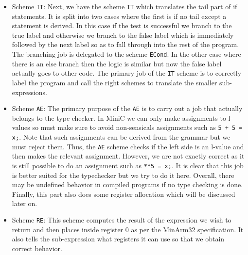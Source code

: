 \documentclass{article}
\begin{document}
\begin{itemize}
  \item Scheme \texttt{IT}: Next, we have the scheme \texttt{IT} which translates the tail part of if statements. It is split into two cases where the first is if no tail except a statement is derived. In this case if the test is successful we branch to the true label and otherwise we branch to the false label which is immediately followed by the next label so as to fall through into the rest of the program. The branching job is delegated to the scheme \texttt{ECond}. In the other case where there is an else branch then the logic is similar but now the false label actually goes to other code. The primary job of the \texttt{IT} scheme is to correctly label the program and call the right schemes to translate the smaller sub-expressions.
  \item Scheme \texttt{AE}: The primary purpose of the \texttt{AE} is to carry out a job that actually belongs to the type checker. In MiniC we can only make assignments to l-values so must make sure to avoid non-sensicals assignments such as \texttt{5 + 5 = x;}. Note that such assignments can be derived from the grammar but we must reject them. Thus, the \texttt{AE} scheme checks if the left side is an l-value and then makes the relevant assignment. However, we are not exactly correct as it is still possible to do an assignment such as \texttt{**5 = x;}. It is clear that this job is better suited for the typechecker but we try to do it here. Overall, there may be undefined behavior in compiled programs if no type checking is done. Finally, this part also does some register allocation which will be discussed later on.
  \item Scheme \texttt{RE}: This scheme computes the result of the expression we wish to return and then places inside register $0$ as per the MinArm32 specification. It also tells the sub-expression what registers it can use so that we obtain correct behavior.

\end{itemize}
\end{document}
